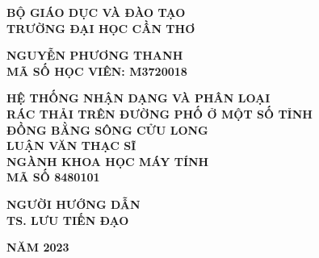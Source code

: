 \documentclass[../the.tex]{subfiles}
\begin{document}
\begin{titlepage}

\begin{center}
\thispagestyle{empty}
{\fontsize{14}{14}\selectfont \textbf{BỘ GIÁO DỤC VÀ ĐÀO TẠO}\\
\textbf{TRƯỜNG ĐẠI HỌC CẦN THƠ\\[2.5cm]}
}


{\fontsize{14}{12}\selectfont
\textbf{NGUYỄN PHƯƠNG THANH\\}}
{\fontsize{15}{12}\selectfont
\textbf{MÃ SỐ HỌC VIÊN: M3720018\\[2.5cm]}}

\begin{large}
\end{large}
{\fontsize{20}{12}\selectfont
\textbf{{HỆ THỐNG NHẬN DẠNG VÀ PHÂN LOẠI
 \\ RÁC THẢI TRÊN ĐƯỜNG PHỐ Ở MỘT SỐ TỈNH \\ ĐỒNG BẰNG SÔNG CỬU LONG}}}
\\[3cm]

{\fontsize{14}{14}\selectfont \textbf{LUẬN VĂN THẠC SĨ}\\
\textbf{NGÀNH KHOA HỌC MÁY TÍNH\\}
\textbf{MÃ SỐ 8480101\\[2cm]}
}

{\fontsize{13}{13}\selectfont \textbf{NGƯỜI HƯỚNG DẪN}\\
\textbf{TS. LƯU TIẾN ĐẠO\\[4cm]}
}

{\fontsize{14}{12}\selectfont
\textbf{NĂM 2023}}

\end{center}

\end{titlepage}
\end{document}
